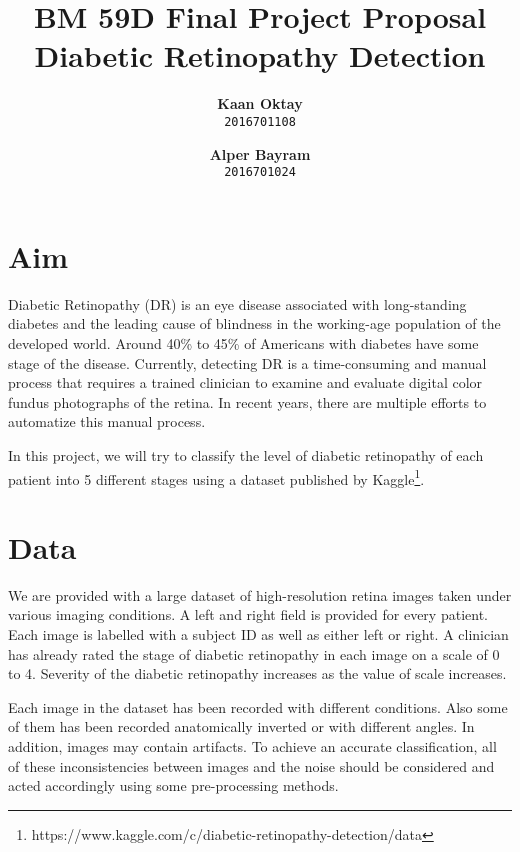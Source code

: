 \documentclass[letterpaper,11pt]{article}
\begin{document}
\title{\bf{BM 59D Final Project Proposal \\ Diabetic Retinopathy Detection}}
\author{
  \textbf{Kaan Oktay}\\
  \texttt{2016701108}
  \and
  \textbf{Alper Bayram}\\
  \texttt{2016701024}
}
\date{}
\maketitle 

\section{Aim}
\hspace{13pt} Diabetic Retinopathy (DR) is an eye disease associated with long-standing diabetes and the leading cause of blindness in the working-age population of the developed world. Around 40\% to 45\% of Americans with diabetes have some stage of the disease. Currently, detecting DR is a time-consuming and manual process that requires a trained clinician to examine and evaluate digital color fundus photographs of the retina. In recent years, there are multiple efforts to automatize this manual process\cite{art1,art2,art3,art4}.

In this project, we will try to classify the level of diabetic retinopathy of each patient into 5 different stages using a dataset published by Kaggle\footnote{https://www.kaggle.com/c/diabetic-retinopathy-detection/data}.  

\section{Data}

\hspace{13pt} We are provided with a large dataset of high-resolution retina images taken under various imaging conditions. A left and right field is provided for every patient. Each image is labelled with a subject ID as well as either left or right. A clinician has already rated the stage of diabetic retinopathy in each image on a scale of 0 to 4. Severity of the diabetic retinopathy increases as the value of scale increases.

Each image in the dataset has been recorded with different conditions. Also some of them has been recorded anatomically inverted or with different angles. In addition, images may contain artifacts. To achieve an accurate classification, all of these inconsistencies between images and the noise should be considered and acted accordingly using some pre-processing methods.
\end{document}
